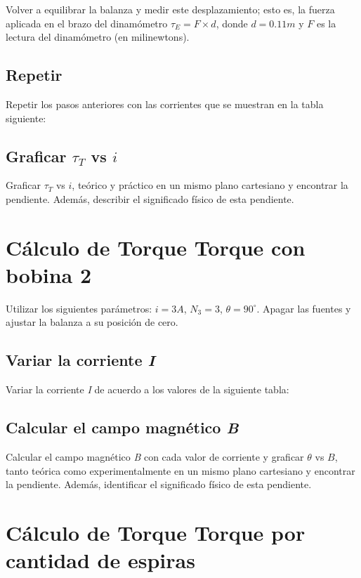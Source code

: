 Volver a equilibrar la balanza y medir este desplazamiento; esto es, la fuerza
aplicada en el brazo del dinamómetro $\tau_{E} = F \times d$, donde $d = 0.11m$
y $F$ es la lectura del dinamómetro (en milinewtons).

\subsection{Repetir}

Repetir los pasos anteriores con las corrientes que se muestran en la
tabla siguiente:

\subsection{Graficar $\tau_{T}$ vs $i$}

Graficar $\tau_{T}$ vs $i$, teórico y práctico en un mismo plano cartesiano y
encontrar la pendiente. Además, describir el significado físico de esta
pendiente.


\section{Cálculo de Torque Torque con bobina 2}

Utilizar los siguientes parámetros: $i = 3A$, $N_3 = 3$, $\theta = 90^{\circ}$.
Apagar las fuentes y ajustar la balanza a su posición de cero.

\subsection{Variar la corriente \textit{I}}

Variar la corriente \textit{I} de acuerdo a los valores de la siguiente tabla:


\subsection{Calcular el campo magnético \textit{B}}

Calcular el campo magnético \textit{B} con cada valor de corriente y graficar
$\theta$ vs $B$, tanto teórica como experimentalmente en un mismo
plano cartesiano y encontrar la pendiente. Además, identificar el
significado físico de esta pendiente.


\section{Cálculo de Torque Torque por cantidad de espiras}

